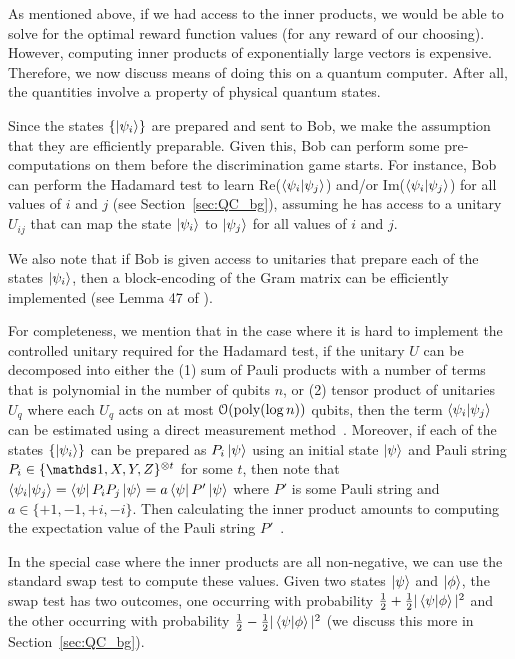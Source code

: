 As mentioned above, if we had access to the inner products, we would be able to solve for the optimal reward function values (for any reward of our choosing).
However, computing inner products of exponentially large vectors is expensive. 
Therefore, we now discuss means of doing this on a quantum computer. 
After all, the quantities involve a property of physical quantum states. 

Since the states $\{\ket{\psi_i}\}$ are prepared and sent to Bob, we make the assumption that they are efficiently preparable. 
Given this, Bob can perform some pre-computations on them before the discrimination game starts. 
For instance, Bob can perform the Hadamard test to learn Re($\braket{\psi_i}{\psi_j}$) and/or Im($\braket{\psi_i}{\psi_j}$) for all values of $i$ and $j$ (see Section~\ref{sec:QC_bg}), assuming he has access to a unitary $U_{ij}$ that can map the state $\ket{\psi_i}$ to $\ket{\psi_j}$ for all values of $i$ and $j$. 

We also note that if Bob is given access to unitaries that prepare each of the states $\ket{\psi_i}$, then a block-encoding of the Gram matrix can be efficiently implemented (see Lemma 47 of \cite{gilyen2019quantum}). 

For completeness, we mention that in the case where it is hard to implement the controlled unitary required for the Hadamard test, if the unitary $U$ can be decomposed into either the
(1) sum of Pauli products with a number of terms that is polynomial in the number of qubits $n$, or
(2) tensor product of unitaries $U_q$ where each $U_q$ acts on at most $\mathcal{O}(\text{poly}(\log n))$ qubits,
then the term $\braket{\psi_i}{\psi_j}$ can be estimated using a direct measurement method~\cite{mitarai2019methodology}.
Moreover, if each of the states $\{\ket{\psi_i}\}$ can be prepared as $P_i \ket{\psi}$ using an initial state $\ket{\psi}$ and Pauli string $P_i \in \{\id, X, Y, Z\}^{\otimes t}$ for some $t$, then note that $\braket{\psi_i}{\psi_j} = \bra{\psi} P_i P_j \ket{\psi} = a \bra{\psi} P' \ket{\psi}$ where $P'$ is some Pauli string and $a \in \{+1, -1, +i, -i\}$.
Then calculating the inner product amounts to computing the expectation value of the Pauli string $P'$~\cite{bharti2021iterative}.

In the special case where the inner products are all non-negative, we can use the standard swap test to compute these values. 
Given two states $\ket{\psi}$ and $\ket{\phi}$, the swap test has two outcomes, one occurring with probability $\frac{1}{2} + \frac{1}{2} | \braket{\psi}{\phi} |^2$ and the other occurring with probability $\frac{1}{2} - \frac{1}{2} | \braket{\psi}{\phi} |^2$ (we discuss this more in Section~\ref{sec:QC_bg}).
  
